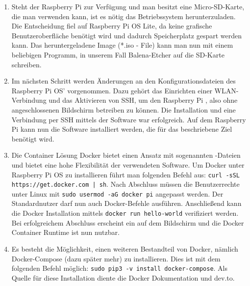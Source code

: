 \begin{enumerate}[leftmargin=*]
\item Steht der Raspberry Pi zur Verfügung und man besitzt eine Micro-SD-Karte, die man verwenden kann, ist es nötig das Betriebssystem herunterzuladen.
      Die Entscheidung fiel auf Raspberry Pi OS Lite, da keine grafische Benutzeroberfläche benötigt wird und dadurch Speicherplatz gespart werden kann.
      Das heruntergeladene Image (*.iso - File) kann man nun mit einem beliebigen Programm, in unserem Fall Balena-Etcher auf die SD-Karte schreiben.

\item Im nächsten Schritt werden Änderungen an den Konfigurationsdateien des Raspberry Pi OS' vorgenommen. Dazu gehört das Einrichten einer WLAN-Verbindung und das Aktivieren von SSH, um den Raspberry Pi , also ohne angeschlossenen Bildschirm  betreiben zu können.
      Die Installation und eine Verbindung per SSH mittels der Software  war erfolgreich.
      Auf dem Raspberry Pi kann nun die Software installiert werden, die für das beschriebene Ziel benötigt wird.

\item Die Container Lösung Docker bietet einen Ansatz mit sogenannten -Dateien und bietet eine hohe Flexibilität der verwendeten Software.
      Um Docker unter Raspberry Pi OS zu installieren führt man folgenden Befehl aus: \texttt{curl -sSL https://get.docker.com | sh}.
      Nach Abschluss müssen die Benutzerrechte unter Linux mit \texttt{sudo usermod -aG docker pi} angepasst werden.
      Der Standardnutzer  darf nun auch Docker-Befehle ausführen.
      Anschließend kann die Docker Installation mittels \texttt{docker run hello-world} verifiziert werden.
      Bei erfolgreichem Abschluss erscheint ein  auf dem Bildschirm und die Docker Container Runtime ist nun nutzbar.

\item Es besteht die Möglichkeit, einen weiteren Bestandteil von Docker, nämlich Docker-Compose (dazu später mehr) zu installieren.
      Dies ist mit dem folgenden Befehl möglich: \texttt{sudo pip3 -v install docker-compose}.
      Als Quelle für diese Installation diente die Docker Dokumentation und dev.to.
\end{enumerate}

